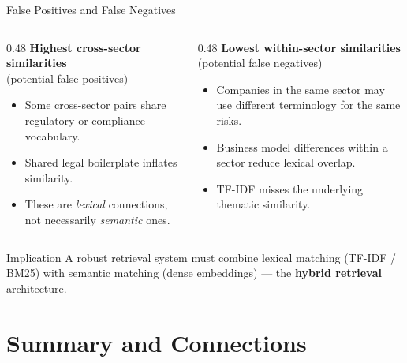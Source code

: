 \documentclass[aspectratio=169,11pt]{beamer}
\begin{document}
\begin{frame}{False Positives and False Negatives}

\begin{columns}[T]
\begin{column}{0.48\textwidth}
\textbf{Highest cross-sector similarities}\\
(potential false positives)

\vspace{6pt}
\begin{itemize}
  \item Some cross-sector pairs share
        regulatory or compliance vocabulary.
  \item Shared legal boilerplate
        inflates similarity.
  \item These are \emph{lexical} connections,
        not necessarily \emph{semantic} ones.
\end{itemize}
\end{column}
\begin{column}{0.48\textwidth}
\textbf{Lowest within-sector similarities}\\
(potential false negatives)

\vspace{6pt}
\begin{itemize}
  \item Companies in the same sector may
        use different terminology for the
        same risks.
  \item Business model differences within
        a sector reduce lexical overlap.
  \item TF-IDF misses the underlying
        thematic similarity.
\end{itemize}
\end{column}
\end{columns}

\vspace{8pt}
\begin{block}{Implication}
A robust retrieval system must combine lexical matching
(TF-IDF / BM25) with semantic matching (dense embeddings)
--- the \textbf{hybrid retrieval} architecture.
\end{block}

\end{frame}

\section{Summary and Connections}
\end{document}
